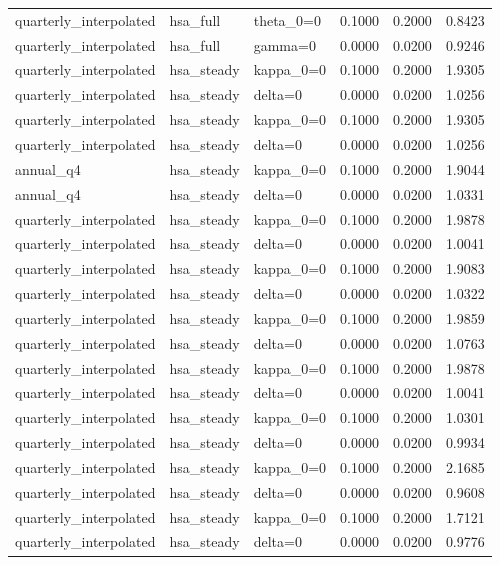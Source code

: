 \begin{tabular}{lllrrr}
quarterly\_interpolated & hsa\_full & theta\_0=0 & 0.1000 & 0.2000 & 0.8423 \\
quarterly\_interpolated & hsa\_full & gamma=0 & 0.0000 & 0.0200 & 0.9246 \\
quarterly\_interpolated & hsa\_steady & kappa\_0=0 & 0.1000 & 0.2000 & 1.9305 \\
quarterly\_interpolated & hsa\_steady & delta=0 & 0.0000 & 0.0200 & 1.0256 \\
quarterly\_interpolated & hsa\_steady & kappa\_0=0 & 0.1000 & 0.2000 & 1.9305 \\
quarterly\_interpolated & hsa\_steady & delta=0 & 0.0000 & 0.0200 & 1.0256 \\
annual\_q4 & hsa\_steady & kappa\_0=0 & 0.1000 & 0.2000 & 1.9044 \\
annual\_q4 & hsa\_steady & delta=0 & 0.0000 & 0.0200 & 1.0331 \\
quarterly\_interpolated & hsa\_steady & kappa\_0=0 & 0.1000 & 0.2000 & 1.9878 \\
quarterly\_interpolated & hsa\_steady & delta=0 & 0.0000 & 0.0200 & 1.0041 \\
quarterly\_interpolated & hsa\_steady & kappa\_0=0 & 0.1000 & 0.2000 & 1.9083 \\
quarterly\_interpolated & hsa\_steady & delta=0 & 0.0000 & 0.0200 & 1.0322 \\
quarterly\_interpolated & hsa\_steady & kappa\_0=0 & 0.1000 & 0.2000 & 1.9859 \\
quarterly\_interpolated & hsa\_steady & delta=0 & 0.0000 & 0.0200 & 1.0763 \\
quarterly\_interpolated & hsa\_steady & kappa\_0=0 & 0.1000 & 0.2000 & 1.9878 \\
quarterly\_interpolated & hsa\_steady & delta=0 & 0.0000 & 0.0200 & 1.0041 \\
quarterly\_interpolated & hsa\_steady & kappa\_0=0 & 0.1000 & 0.2000 & 1.0301 \\
quarterly\_interpolated & hsa\_steady & delta=0 & 0.0000 & 0.0200 & 0.9934 \\
quarterly\_interpolated & hsa\_steady & kappa\_0=0 & 0.1000 & 0.2000 & 2.1685 \\
quarterly\_interpolated & hsa\_steady & delta=0 & 0.0000 & 0.0200 & 0.9608 \\
quarterly\_interpolated & hsa\_steady & kappa\_0=0 & 0.1000 & 0.2000 & 1.7121 \\
quarterly\_interpolated & hsa\_steady & delta=0 & 0.0000 & 0.0200 & 0.9776 \\
\bottomrule
\end{tabular}
